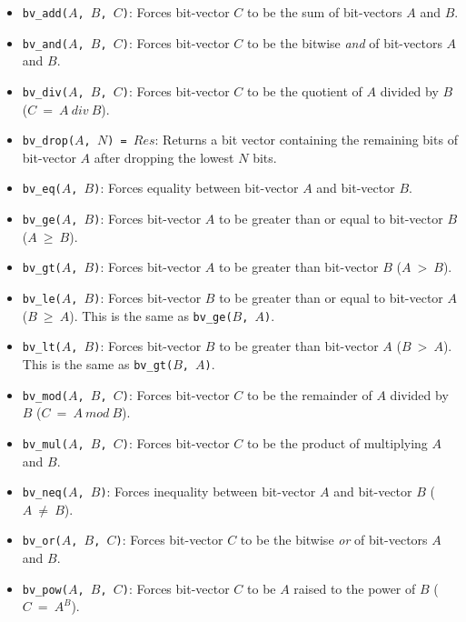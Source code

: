 \begin{itemize}
\item \texttt{bv\_add($A$, $B$, $C$)}: Forces bit-vector $C$ to be the sum of bit-vectors $A$ and $B$.
\item \texttt{bv\_and($A$, $B$, $C$)}: Forces bit-vector $C$ to be the bitwise \textit{and} of bit-vectors $A$ and $B$.
\item \texttt{bv\_div($A$, $B$, $C$)}: Forces bit-vector $C$ to be the quotient of $A$ divided by $B$ ($C\ =\ A\ div\ B$).
\item \texttt{bv\_drop($A$, $N$) = $Res$}: Returns a bit vector containing the remaining bits of bit-vector $A$ after dropping the lowest $N$ bits.
\item \texttt{bv\_eq($A$, $B$)}: Forces equality between bit-vector $A$ and bit-vector $B$.
\item \texttt{bv\_ge($A$, $B$)}: Forces bit-vector $A$ to be greater than or equal to bit-vector $B$ ($A\ \ge\ B$).
\item \texttt{bv\_gt($A$, $B$)}: Forces bit-vector $A$ to be greater than bit-vector $B$ ($A\ >\ B$).
\item \texttt{bv\_le($A$, $B$)}: Forces bit-vector $B$ to be greater than or equal to bit-vector $A$ ($B\ \ge\ A$). This is the same as \texttt{bv\_ge($B$, $A$)}.
\item \texttt{bv\_lt($A$, $B$)}: Forces bit-vector $B$ to be greater than bit-vector $A$ ($B\ >\ A$). This is the same as \texttt{bv\_gt($B$, $A$)}.
\item \texttt{bv\_mod($A$, $B$, $C$)}: Forces bit-vector $C$ to be the remainder of $A$ divided by $B$ ($C\ =\ A\ mod\ B$).
\item \texttt{bv\_mul($A$, $B$, $C$)}: Forces bit-vector $C$ to be the product of multiplying $A$ and $B$.
\item \texttt{bv\_neq($A$, $B$)}: Forces inequality between bit-vector $A$ and bit-vector $B$ ($A\ \neq\ B$).
\item \texttt{bv\_or($A$, $B$, $C$)}: Forces bit-vector $C$ to be the bitwise \textit{or} of bit-vectors $A$ and $B$.
\item \texttt{bv\_pow($A$, $B$, $C$)}: Forces bit-vector $C$ to be $A$ raised to the power of $B$ ($C\ =\ A^B$).

\end{itemize}
